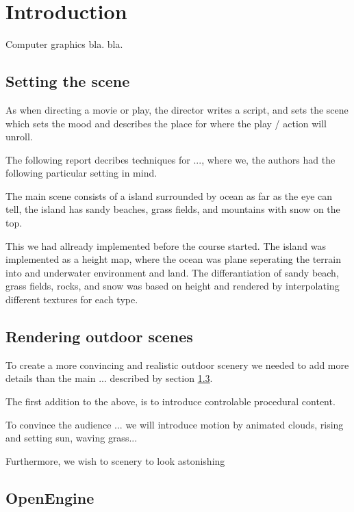 
\chapter{Introduction}
Computer graphics bla. bla. 

\section{Setting the scene}
As when directing a movie or play, the director writes a script, and
sets the scene which sets the mood and describes the place for where
the play / action will unroll.

The following report decribes techniques for ..., where we, the
authors had the following particular setting in mind.

The main scene consists of a island surrounded by ocean as far as the
eye can tell, the island has sandy beaches, grass fields, and mountains
with snow on the top.

This we had allready implemented before the course started. The island
was implemented as a height map, where the ocean was plane seperating
the terrain into and underwater environment and land. The
differantiation of sandy beach, grass fields, rocks, and snow was
based on height and rendered by interpolating different textures for
each type.

\section{Rendering outdoor scenes}
To create a more convincing and realistic outdoor scenery we needed to
add more details than the main ... described by section \ref{}.

The first addition to the above, is to introduce controlable
procedural content.

To convince the audience ... we will introduce motion by animated
clouds, rising and setting sun, waving grass...


Furthermore, we wish to scenery to look astonishing



\section{OpenEngine}



